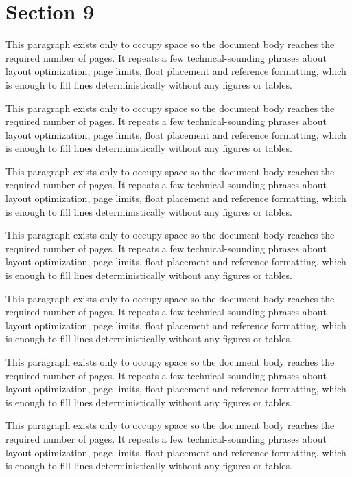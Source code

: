 \documentclass[10pt,letterpaper]{article}
\begin{document}
\section{Section 9}
This paragraph exists only to occupy space so the document body reaches the required number of pages. It repeats a few technical-sounding phrases about layout optimization, page limits, float placement and reference formatting, which is enough to fill lines deterministically without any figures or tables.

This paragraph exists only to occupy space so the document body reaches the required number of pages. It repeats a few technical-sounding phrases about layout optimization, page limits, float placement and reference formatting, which is enough to fill lines deterministically without any figures or tables.

This paragraph exists only to occupy space so the document body reaches the required number of pages. It repeats a few technical-sounding phrases about layout optimization, page limits, float placement and reference formatting, which is enough to fill lines deterministically without any figures or tables.

This paragraph exists only to occupy space so the document body reaches the required number of pages. It repeats a few technical-sounding phrases about layout optimization, page limits, float placement and reference formatting, which is enough to fill lines deterministically without any figures or tables.

This paragraph exists only to occupy space so the document body reaches the required number of pages. It repeats a few technical-sounding phrases about layout optimization, page limits, float placement and reference formatting, which is enough to fill lines deterministically without any figures or tables.

This paragraph exists only to occupy space so the document body reaches the required number of pages. It repeats a few technical-sounding phrases about layout optimization, page limits, float placement and reference formatting, which is enough to fill lines deterministically without any figures or tables.

This paragraph exists only to occupy space so the document body reaches the required number of pages. It repeats a few technical-sounding phrases about layout optimization, page limits, float placement and reference formatting, which is enough to fill lines deterministically without any figures or tables.
\end{document}
